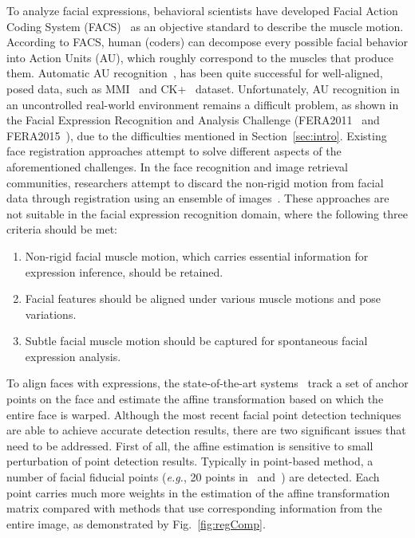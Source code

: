 \documentclass[10pt,journal]{IEEEtran}
\begin{document}
To analyze facial expressions, behavioral scientists have developed Facial Action Coding System (FACS)~\cite{Ekman78} as an objective standard to describe the muscle motion. According to FACS, human (coders) can decompose every possible facial behavior into Action Units (AU), which roughly correspond to the muscles that produce them. Automatic AU recognition~\cite{Zhao_PAMI07}\cite{Valstar_SMCB12}, has been quite successful for well-aligned, posed data, such as MMI~\cite{Pantic_ICME05} and CK+~\cite{Kanade_FG00} dataset. Unfortunately, AU recognition in an uncontrolled real-world environment remains a difficult problem, as shown in the Facial Expression Recognition and Analysis Challenge (FERA2011~\cite{Valstar_FERA11} and FERA2015~\cite{FERA15}), due to the difficulties mentioned in Section~\ref{sec:intro}. Existing face registration approaches attempt to solve different aspects of the aforementioned challenges. In the face recognition and image retrieval communities, researchers attempt to discard the non-rigid motion from facial data through registration using an ensemble of images~\cite{LearnedMiller_PAMI06}\cite{Huang_ICCV07}\cite{Peng_PAMI12}. These approaches are not suitable in the facial expression recognition domain, where the following three criteria should be met:
\begin{enumerate}
\item Non-rigid facial muscle motion, which carries essential information for expression inference, should be retained. 
\item Facial features should be aligned under various muscle motions and pose variations. 
\item Subtle facial muscle motion should be captured for spontaneous facial expression analysis.
\end{enumerate}

To align faces with expressions, the state-of-the-art systems~\cite{Valstar_SMCB12,Littlewort_CERT_FG2011,Tadas_FERA15} track a set of anchor points on the face and estimate the affine transformation based on which the entire face is warped. Although the most recent facial point detection techniques~\cite{Martinez_PAMI13,Xiong13,Zhu_CVPR12,Tadas_ECCV14} are able to achieve accurate detection results, there are two significant issues that need to be addressed. First of all, the affine estimation is sensitive to small perturbation of point detection results. Typically in point-based method, a number of facial fiducial points (\textit{e.g.}, 20 points in~\cite{Valstar_SMCB12} and~\cite{Martinez_PAMI13}) are detected. Each point carries much more weights in the estimation of the affine transformation matrix compared with methods that use corresponding information from the entire image, as demonstrated by Fig.~\ref{fig:regComp}.
\end{document}

